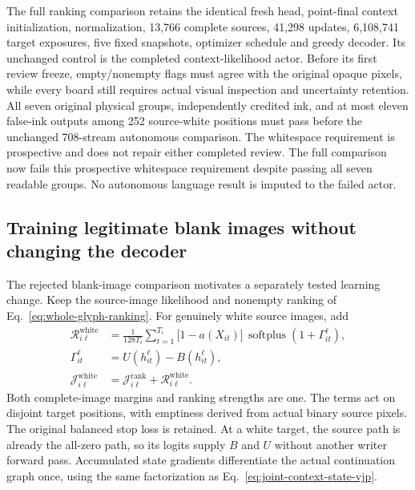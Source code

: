 \documentclass[12pt,a4paper]{article}
\providecommand{\DIFadd}[1]{{\protect\color{blue} \sf #1}} %
\begin{document}
\DIFadd{The full ranking comparison retains the identical fresh head, point-final
context initialization, normalization, 13,766 complete sources, 41,298 updates,
6,108,741 target exposures, five fixed snapshots, optimizer schedule and
greedy decoder. Its unchanged control is the completed context-likelihood
actor. Before its first review freeze, empty/nonempty flags must agree with
the original opaque pixels, while every board still requires actual visual
inspection and uncertainty retention. All seven original physical groups,
independently credited ink, and at most eleven false-ink outputs among 252
source-white positions must pass before the unchanged 708-stream autonomous
comparison. The whitespace requirement is prospective and does not repair
either completed review. The full comparison now fails this prospective
whitespace requirement despite passing all seven readable groups. No autonomous
language result is imputed to the failed actor.
}

\subsection*{\DIFadd{Training legitimate blank images without changing the decoder}}

\DIFadd{The rejected blank-image comparison motivates a separately tested learning
change. Keep the source-image likelihood and nonempty ranking of
Eq.~\ref{eq:whole-glyph-ranking}. For genuinely white source images, add
}\begin{equation}
 \begin{aligned}
 \mathcal R^{\mathrm{white}}_{i\ell}
 &=\frac{1}{128T_i}\sum_{t=1}^{T_i}\bigl[1-a(X_{it})\bigr]\,
    \operatorname{softplus}\!\left(1+\Gamma_{it}^{\ell}\right),\\
 \Gamma_{it}^{\ell}
 &=U(h_{it}^{\ell})-B(h_{it}^{\ell}),\\
 \mathcal J^{\mathrm{white}}_{i\ell}
 &=\mathcal J^{\mathrm{rank}}_{i\ell}+\mathcal R^{\mathrm{white}}_{i\ell}.
 \end{aligned}
 \label{eq:white-target-ranking}
\end{equation}
\DIFadd{Both complete-image margins and ranking strengths are one. The terms act on
disjoint target positions, with emptiness derived from actual binary source
pixels. The original balanced stop loss is retained. At a white target, the
source path is already the all-zero path, so its logits supply $B$ and $U$
without another writer forward pass. Accumulated state gradients differentiate
the actual continuation graph once, using the same factorization as
Eq.~\ref{eq:joint-context-state-vjp}.
}
\end{document}
